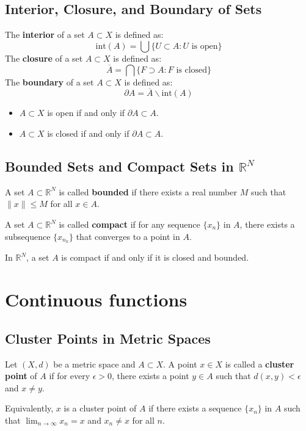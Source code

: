 \subsection{Interior, Closure, and Boundary of Sets}
\begin{definition}
    The \textbf{interior} of a set $A \subset X$ is defined as: $$\text{int}(A) = \bigcup \{U \subset A: U \text{ is open}\}$$
    The \textbf{closure} of a set $A \subset X$ is defined as: $$\overline{A} = \bigcap \{F \supset A: F \text{ is closed}\}$$
    The \textbf{boundary} of a set $A \subset X$ is defined as: $$\partial A = \overline{A} \backslash \text{int}(A)$$
\end{definition}

\begin{proposition}
    \begin{itemize}
        \item $A \subset X$ is open if and only if $\partial A \subset A$.
        \item $A \subset X$ is closed if and only if $\partial A \subset A$.
    \end{itemize}
\end{proposition}
\subsection{Bounded Sets and Compact Sets in $\mathbb{R}^N$}
\begin{definition}
    A set $A \subset \mathbb{R}^N$ is called \textbf{bounded} if there exists a real number $M$ such that $\|x\| \leq M$ for all $x \in A$.

    A set $A \subset \mathbb{R}^N$ is called \textbf{compact} if for any sequence $\{x_n\}$ in $A$, there exists a subsequence $\{x_{n_k}\}$ that converges to a point in $A$.
\end{definition}

\begin{theorem} 
    In $\mathbb{R}^N$, a set $A$ is compact if and only if it is closed and bounded.
\end{theorem}

\section{Continuous functions}
\subsection{Cluster Points in Metric Spaces}
\begin{definition}
    Let $(X,d)$ be a metric space and $A \subset X$. A point $x \in X$ is called a \textbf{cluster point} of $A$ if for every $\epsilon > 0$, there exists a point $y \in A$ such that $d(x,y) < \epsilon$ and $x \neq y$.

    Equivalently, $x$ is a cluster point of $A$ if there exists a sequence $\{x_n\}$ in $A$ such that $\lim_{n \rightarrow \infty} x_n = x$ and $x_n \neq x$ for all $n$.
\end{definition}

